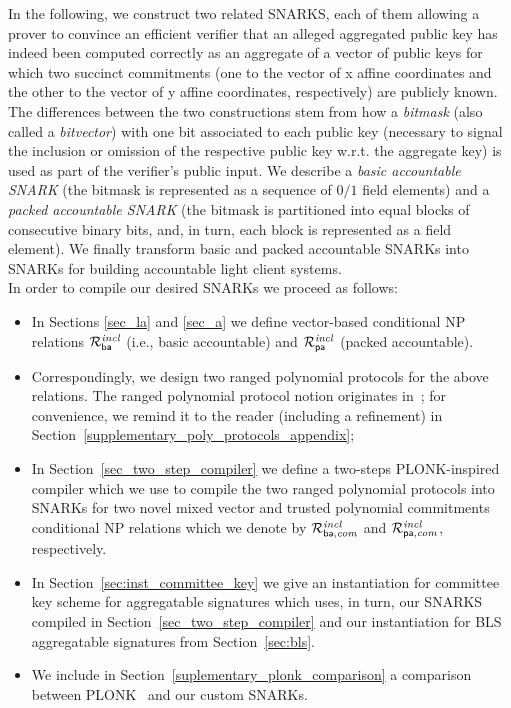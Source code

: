 \label{sec:snarks}

In the following, we construct two related SNARKS, each of them allowing a prover to convince an 
efficient verifier that an alleged aggregated public key has indeed been computed correctly as an aggregate 
of a vector of public keys for which two succinct commitments (one to the vector of x affine coordinates and the other 
to the vector of y affine coordinates, respectively) are publicly known. The differences between the two  
constructions stem from how a \emph{bitmask} (also called a \emph{bitvector}) with one bit associated to each public key 
(necessary to signal the inclusion or omission of the respective public key w.r.t. the aggregate key) 
is used as part of the verifier's public input. We describe a 
\emph{basic accountable SNARK} (the bitmask is represented as a sequence of $0/1$ field elements) and a \emph{packed accountable SNARK} (the bitmask is 
partitioned into equal blocks of consecutive binary bits, and, in turn, each block is represented as a field element). 
We finally transform basic and packed accountable SNARKs into SNARKs for building accountable light client systems. \\

\noindent In order to compile our desired SNARKs we proceed as follows:
\begin{itemize}
\item In Sections \ref{sec_la} and \ref{sec_a} we define vector-based conditional NP relations $\mathcal{R}^{\mathit{incl}}_{\mathsf{ba}}$ (i.e., basic accountable) and $\mathcal{R}^{\mathit{incl}}_{\mathsf{pa}}$ (packed accountable).  
\item Correspondingly, we design two ranged polynomial protocols for the above relations. The ranged polynomial protocol notion originates in~\cite{plonk}; 
for convenience, we remind it to the reader (including a refinement) in Section~\ref{supplementary_poly_protocols_appendix};  
\item In Section~\ref{sec_two_step_compiler} we define a two-steps PLONK-inspired compiler which we use to compile the two ranged polynomial protocols into 
SNARKs for two novel mixed vector and trusted polynomial commitments conditional NP relations which we denote by 
$\mathcal{R}^{\mathit{incl}}_{\mathsf{ba},\mathit{com}}$ and $\mathcal{R}^{\mathit{incl}}_{\mathsf{pa},\mathit{com}}$, respectively. 
\item In Section~\ref{sec:inst_committee_key} we give an instantiation for committee key scheme for aggregatable signatures which uses, in turn, our SNARKS 
compiled in Section~\ref{sec_two_step_compiler} and our instantiation for BLS aggregatable signatures from Section~\ref{sec:bls}. 
\item We include in Section~\ref{suplementary_plonk_comparison} a comparison between PLONK~\cite{plonk} and our custom SNARKs. 
\end{itemize}

